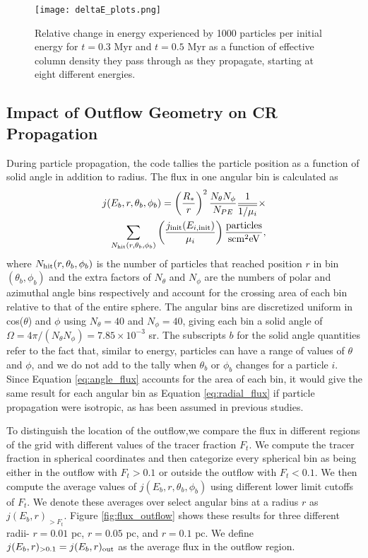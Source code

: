 \documentclass[twocolumn]{aastex63}
\def\lp{\left(}
\def\rp{\right)}
\begin{document}
\begin{figure*}
\centering
\texttt{[image: deltaE\_plots.png]}
\caption{Relative change in energy experienced by 1000 particles per initial energy for $t=0.3$ Myr and $t=0.5$  Myr as a function of effective column density they pass through as they propagate, starting at eight different energies.}
\label{fig:deltaE}
\end{figure*}


\subsection{Impact of Outflow Geometry on CR Propagation}
\label{subsection:geometry}

During particle propagation, the code tallies the particle position as a function of solid angle in addition to radius. The flux in one angular bin is calculated as 
\begin{eqnarray}
\label{eq:angle_flux}
j(E_b, r, \theta_b, \phi_b)=\lp\frac{R_*}{r}\rp^2 \frac{N_{\theta}N_{\phi}}{N_{PE}}  \frac{1}{\overline{1/\mu_i}} \times \nonumber \\ 
\sum_{N_{\rm hit} (r, \theta_b, \phi_b)} \lp\frac{j_{\rm init}(E_{i,\rm init})}{\mu_i}\rp  \frac{\rm particles} {\rm s cm^2 eV},
\end{eqnarray}
where $N_{\rm hit} (r, \theta_b, \phi_b)$ is the number of particles that reached position $r$ in bin $(\theta_b, \phi_b)$ and the extra factors of $N_{\theta}$ and $N_{\phi}$ are the numbers of polar and azimuthal angle bins respectively and account for the crossing area of each bin relative to that of the entire sphere. The angular bins are discretized uniform in cos($\theta$) and $\phi$ using $N_{\theta}=40$ and $N_{\phi}=40$, giving each bin a solid angle of $\Omega=4\pi/(N_{\theta}N_{\phi})=7.85 \times 10^{-3}$ sr. The subscripts $b$ for the solid angle quantities refer to the fact that, similar to energy, particles can have a range of values of $\theta$ and $\phi$, and we do not add to the tally when $\theta_b$ or $\phi_b$ changes for a particle $i$. Since Equation \ref{eq:angle_flux} accounts for the area of each bin, it would give the same result for each angular bin as Equation \ref{eq:radial_flux} if particle propagation were isotropic, as has been assumed in previous studies. 

To distinguish the location of the outflow,we compare the flux in different regions of the grid with different values of the tracer fraction $F_t$. We compute the tracer fraction in spherical coordinates and then categorize every spherical bin as being either in the outflow with $F_t>0.1$ or outside the outflow with $F_t<0.1$. We then compute the average values of $j(E_b, r, \theta_b, \phi_b)$ using different lower limit cutoffs of $F_t$. We denote these averages over select angular bins at a radius $r$ as $j(E_b, r)_{> F_t}$. Figure \ref{fig:flux_outflow} shows these results for three different radii- $r=0.01$ pc, $r=0.05$ pc, and $r=0.1$ pc. We define $j(E_b, r)_{> 0.1} = j(E_b, r)_{\rm out}$ as the average flux in the outflow region.
\end{document}

